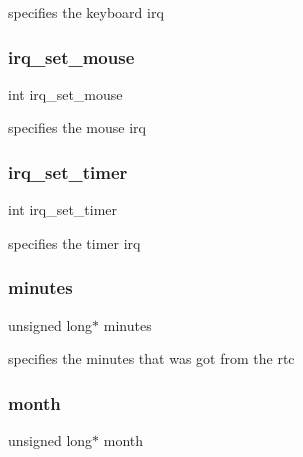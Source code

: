 specifies the keyboard irq 

\mbox{\label{struct_game_afd357e4e90c5ce77865791f8e690db27}} 
\subsubsection{\texorpdfstring{irq\+\_\+set\+\_\+mouse}{irq\_set\_mouse}}
{\footnotesize\ttfamily int irq\+\_\+set\+\_\+mouse}



specifies the mouse irq 

\mbox{\label{struct_game_aadbf3757def1a49b68caa15ef9117b0f}} 
\subsubsection{\texorpdfstring{irq\+\_\+set\+\_\+timer}{irq\_set\_timer}}
{\footnotesize\ttfamily int irq\+\_\+set\+\_\+timer}



specifies the timer irq 

\mbox{\label{struct_game_a89704c83034c5498c532304b4a6a0f15}} 
\subsubsection{\texorpdfstring{minutes}{minutes}}
{\footnotesize\ttfamily unsigned long$\ast$ minutes}



specifies the minutes that was got from the rtc 

\mbox{\label{struct_game_ab0060eb6fa8a06edfb9a93b2eb1057f6}} 
\subsubsection{\texorpdfstring{month}{month}}
{\footnotesize\ttfamily unsigned long$\ast$ month}



